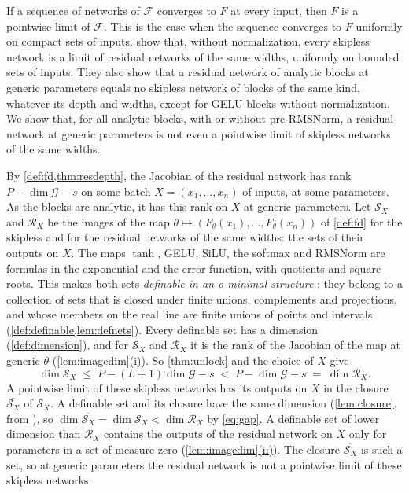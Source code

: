 \documentclass[10pt]{article}
\theoremstyle{definition}
\theoremstyle{remark}
\newcommand{\G}{\mathcal{G}}
\DeclareRobustCommand{\cpref}[2]{\hyperref[#1:#2]{\cref*{#1}(#2)}}
\begin{document}
If a sequence of networks of $\mathcal F$ converges to $F$ at every input, then $F$ is a pointwise limit of $\mathcal F$. This is the case when the sequence converges to $F$ uniformly on compact sets of inputs. \citet{mijoski2026worth} show that, without normalization, every skipless network is a limit of residual networks of the same widths, uniformly on bounded sets of inputs. They also show that a residual network of analytic blocks at generic parameters equals no skipless network of blocks of the same kind, whatever its depth and widths, except for GELU blocks without normalization. We show that, for all analytic blocks, with or without pre-RMSNorm, a residual network at generic parameters is not even a pointwise limit of skipless networks of the same widths.

By \cref{def:fd,thm:resdepth}, the Jacobian of the residual network has rank $P - \dim\G - s$ on some batch $X = (x_1, \dots, x_n)$ of inputs, at some parameters. As the blocks are analytic, it has this rank on $X$ at generic parameters. Let $\mathcal S_X$ and $\mathcal R_X$ be the images of the map $\theta \mapsto (F_\theta(x_1), \dots, F_\theta(x_n))$ of \cref{def:fd} for the skipless and for the residual networks of the same widths: the sets of their outputs on $X$. The maps $\tanh$, GELU, SiLU, the softmax and RMSNorm are formulas in the exponential and the error function, with quotients and square roots. This makes both sets \emph{definable in an o-minimal structure} \citep{speissegger1997pfaffian}: they belong to a collection of sets that is closed under finite unions, complements and projections, and whose members on the real line are finite unions of points and intervals (\cref{def:definable,lem:defnets}). Every definable set has a dimension (\cref{def:dimension}), and for $\mathcal S_X$ and $\mathcal R_X$ it is the rank of the Jacobian of the map at generic $\theta$ (\cpref{lem:imagedim}{i}). So \cref{thm:unlock} and the choice of $X$ give
\begin{equation}\label{eq:gap}
\dim\mathcal S_X \;\le\; P - (L+1)\dim\G - s \;<\; P - \dim\G - s \;=\; \dim\mathcal R_X.
\end{equation}
A pointwise limit of these skipless networks has its outputs on $X$ in the closure $\overline{\mathcal S_X}$ of $\mathcal S_X$. A definable set and its closure have the same dimension (\cref{lem:closure}, from \citealp[Chapter~4, Theorem~(1.8)]{vandendries1998tame}), so $\dim\overline{\mathcal S_X} = \dim\mathcal S_X < \dim\mathcal R_X$ by \eqref{eq:gap}. A definable set of lower dimension than $\mathcal R_X$ contains the outputs of the residual network on $X$ only for parameters in a set of measure zero (\cpref{lem:imagedim}{ii}). The closure $\overline{\mathcal S_X}$ is such a set, so at generic parameters the residual network is not a pointwise limit of these skipless networks.
\end{document}
